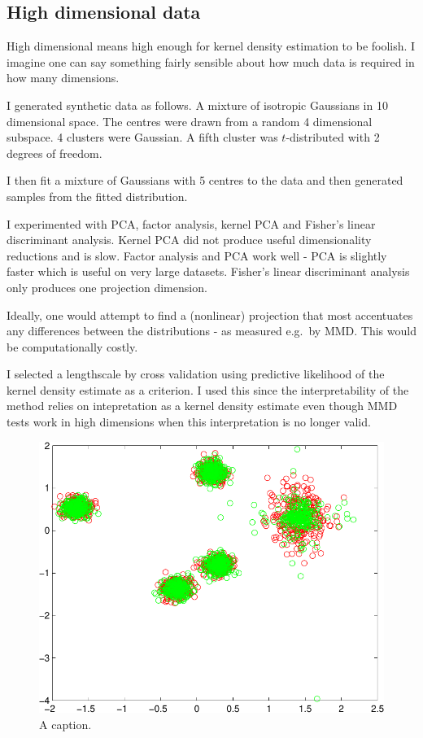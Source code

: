 \documentclass{article} %
\def\eg{e.g.\ }
\begin{document}
\subsection{High dimensional data}


High dimensional means high enough for kernel density estimation to be foolish.
I imagine one can say something fairly sensible about how much data is required in how many dimensions.

I generated synthetic data as follows.
A mixture of isotropic Gaussians in 10 dimensional space.
The centres were drawn from a random 4 dimensional subspace.
4 clusters were Gaussian.
A fifth cluster was $t$-distributed with 2 degrees of freedom.

I then fit a mixture of Gaussians with 5 centres to the data and then generated samples from the fitted distribution.

I experimented with PCA, factor analysis, kernel PCA and Fisher's linear discriminant analysis.
Kernel PCA did not produce useful dimensionality reductions and is slow.
Factor analysis and PCA work well - PCA is slightly faster which is useful on very large datasets.
Fisher's linear discriminant analysis only produces one projection dimension.

Ideally, one would attempt to find a (nonlinear) projection that most accentuates any differences between the distributions - as measured \eg by MMD.
This would be computationally costly.

I selected a lengthscale by cross validation using predictive likelihood of the kernel density estimate as a criterion.
I used this since the interpretability of the method relies on intepretation as a kernel density estimate even though MMD tests work in high dimensions when this interpretation is no longer valid.

\begin{figure}[ht]
\centering
\includegraphics[width=0.98\columnwidth]{figures/high_mog_fa}
\caption{
A caption.
}
\label{fig:high_mog_fa}
\end{figure}
\end{document}
